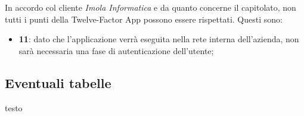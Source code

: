 In accordo col cliente \textit{Imola Informatica} e da quanto concerne il capitolato, non tutti i punti della Twelve-Factor App possono essere rispettati. Questi sono:

\begin{itemize}
	\item \textbf{11}: dato che l'applicazione verrà eseguita nella rete interna dell'azienda, non sarà necessaria una fase di autenticazione dell'utente;
\end{itemize}

\subsection{Eventuali tabelle}
testo